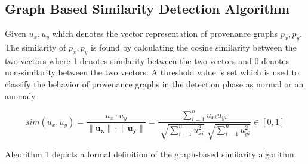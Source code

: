 







\subsection{Graph Based Similarity Detection Algorithm}

Given $u_x, u_y$ which denotes the vector representation of provenance graphs $p_x, p_y$. The similarity of $p_x, p_y$ is found by calculating the cosine similarity between the two vectors where 1 denotes similarity between the two vectors and 0 denotes non-similarity between the two vectors. A threshold value is set which is used to classify the behavior of provenance graphs in the detection phase as normal or an anomaly.

\[sim(u_x,u_y) =  \dfrac{u_x \cdot  u_y}{ \lVert \mathbf{u_x} \rVert \cdot \lVert \mathbf{u_y} \rVert} =\dfrac{\sum_{i=1}^n u_{xi} u_{yi} }{\sqrt[]{\sum_{i=1}^n u_{xi}^2} \sqrt[]{\sum_{i=1}^n u_{yi}^2}}  \in [0,1] \]


Algorithm 1 depicts a formal definition of the graph-based similarity algorithm.




